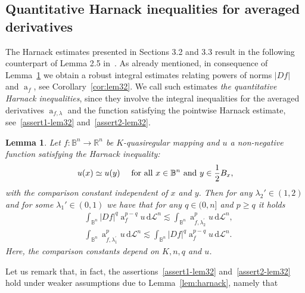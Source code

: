 \documentclass[11pt,a4paper,reqno]{amsart}
\newtheorem{lem}[theorem]{Lemma}
\theoremstyle{definition}
\renewcommand{\a}{\operatorname{a}}
\newcommand{\B}{\mathbb{B}^n}
\newcommand{\R}{\mathbb{R}}
\newcommand{\Rn}{{\mathbb R}^n}
\newcommand{\Leb}{\mathrm {d}{\mathcal L}^{n}}
\numberwithin{komcounter}{section}
\begin{document}
\subsection{Quantitative Harnack inequalities for averaged derivatives}

The Harnack estimates presented in Sections 3.2 and 3.3 result in the following counterpart of Lemma 2.5 in~\cite{ak}. As already mentioned, in consequence of Lemma~\ref{lem:2.5AK} we obtain a robust integral estimates relating powers of norms $|Df|$ and $\a_f$, see Corollary~\ref{cor:lem32}. We call such estimates \emph{the quantitative Harnack inequalities}, since they involve the integral inequalities for the averaged derivatives $\a_{f, \lambda}$ and the function satisfying the pointwise Harnack estimate, see~\eqref{assert1-lem32} and~\eqref{assert2-lem32}.
\begin{lem}\label{lem:2.5AK}
	Let $f:\B\rightarrow \R^n$ be $K$-quasiregular mapping and $u$ a non-negative function satisfying the Harnack inequality:
\[
   u(x)\simeq u(y)\quad \hbox{ for all } x\in\B \hbox{ and }y\in \frac{1}{2}B_x,
 \]  
   with the comparison constant independent of $x$ and $y$. Then for any $\lambda_2'\in (1,2)$ and for some $\lambda_1' \in (0,1)$ we have that for any $q\in (0,n]$ and $p\geq q$ it holds
\begin{align}
& \int_{\B}|Df|^q\a_{f}^{p-q}u\, \Leb\lesssim \int_{\B}\a_{f,\lambda_2^\prime }^pu\, \Leb, \label{assert1-lem32}\\
& \int_{\B}\a_{f,\lambda_1^\prime }^pu\, \Leb\lesssim \int_{\B}|Df|^q\a_{f}^{p-q}u\, \Leb. \label{assert2-lem32}
\end{align}
	Here, the comparison constants depend on $K,n,q$ and $u$.
	
\end{lem}
Let us remark that, in fact, the assertions~\eqref{assert1-lem32} and~\eqref{assert2-lem32} hold under weaker assumptions due to Lemma~\ref{lem:harnack}, namely that
\smallskip
\end{document}
